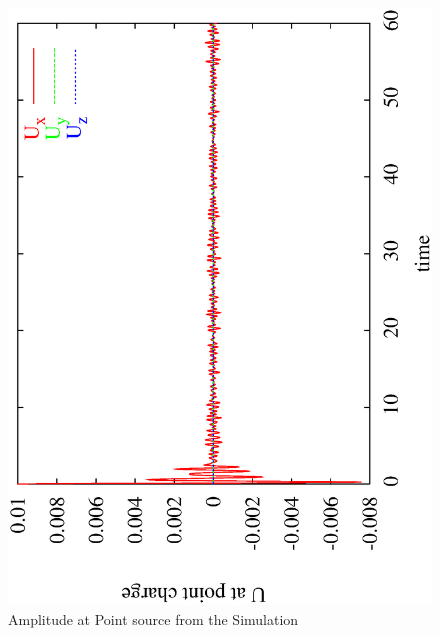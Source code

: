 \begin{figure}[t!]
\centerline{\includegraphics[width=14cm]{WavePC}}
\caption{Amplitude at Point source from the Simulation}
\label{WAVE FIG 1}
\end{figure}

